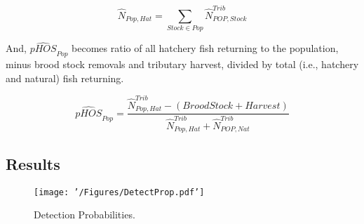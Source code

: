 \documentclass[]{article}
\begin{document}
\[
\hat{N}_{Pop,Hat} = \sum_{Stock \in Pop} \hat{N}^{Trib}_{POP,Stock}
\]

And, \(\hat{pHOS}_{Pop}\) becomes ratio of all hatchery fish returning
to the population, minus brood stock removals and tributary harvest,
divided by total (i.e., hatchery and natural) fish returning.

\[
\hat{pHOS}_{Pop} = \frac{\hat{N}^{Trib}_{Pop,Hat}-(BroodStock + Harvest)}{\hat{N}^{Trib}_{Pop,Hat}+\hat{N}^{Trib}_{POP,Nat}}
\]

\hypertarget{results}{%
\subsection{Results}\label{results}}

\begin{figure}
\centering
\texttt{[image: '/Figures/DetectProp.pdf']}
\caption{Detection Probabilities.}
\end{figure}
\end{document}
